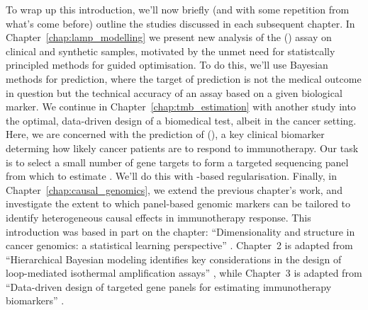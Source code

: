 \documentclass[thesis.tex]{subfiles}
\begin{document}
To wrap up this introduction, we'll now briefly (and with some repetition from what's come before) outline the studies discussed in each subsequent chapter. In Chapter~\ref{chap:lamp_modelling} we present new analysis of the  () assay on clinical and synthetic samples, motivated by the unmet need for statistcally principled methods for guided  optimisation. To do this, we'll use Bayesian methods for prediction, where the target of prediction is not the medical outcome in question but the technical accuracy of an assay based on a given biological marker. 
We continue in Chapter~\ref{chap:tmb_estimation} with another study into the optimal, data-driven design of a biomedical test, albeit in the cancer setting. Here, we are concerned with the prediction of  (), a key clinical biomarker determing how likely cancer patients are to respond to immunotherapy. Our task is to select a small number of gene targets to form a targeted  sequencing panel from which to estimate . We'll do this with -based regularisation.
Finally, in Chapter~\ref{chap:causal_genomics}, we extend the previous chapter's work, and investigate the extent to which panel-based genomic markers can be tailored to identify heterogeneous causal effects in immunotherapy response. This introduction was based in part on the chapter: ``Dimensionality and structure in cancer genomics: a statistical learning perspective'' \citep{bradley_dimensionality_2020}. Chapter~2 is adapted from ``Hierarchical Bayesian modeling identifies key considerations in the design of loop-mediated isothermal amplification assays'' \citep{bradley_hierarchical_2023}, while Chapter~3 is adapted from ``Data-driven design of targeted gene panels for estimating immunotherapy biomarkers'' \citep{bradley_data-driven_2021, bradley_data-driven_2022}.

\dobib %
\end{document}
